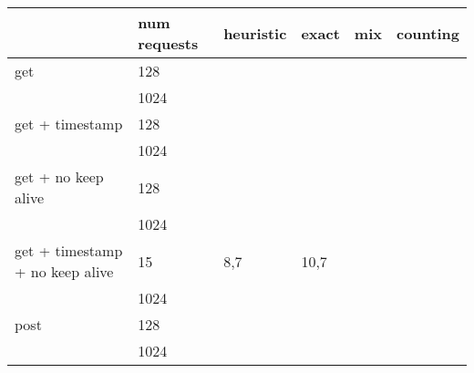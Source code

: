 \documentclass[a4paper]{report}
\begin{document}
\begin{table}[]
	\begin{tabular}{l l|l l l l}
		\hline
		                                & num requests & heuristic & exact & mix & counting \\ \hline
		get                             & 128          &           &       &     &          \\
		                                & 1024         &           &       &     &          \\ \hline
		get + timestamp                 & 128          &           &       &     &          \\
		                                & 1024         &           &       &     &          \\ \hline
		get + no keep alive             & 128          &           &       &     &          \\
		                                & 1024         &           &       &     &          \\ \hline
		get + timestamp + no keep alive & 15           & 8,7       & 10,7  &     &          \\
		                                & 1024         &           &       &     &          \\ \hline
		post                            & 128          &           &       &     &          \\
		                                & 1024         &           &       &     &          \\
	\end{tabular}
\end{table}
\end{document}
